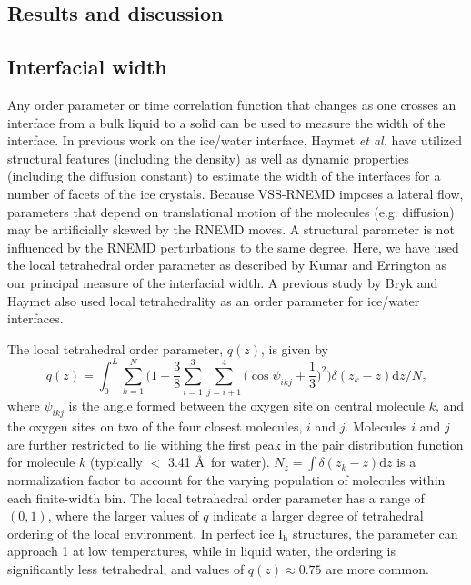 \documentclass[11pt]{article}
\begin{document}
\begin{doublespace}
\section{Results and discussion}

\subsection{Interfacial width}
Any order parameter or time correlation function that changes as one
crosses an interface from a bulk liquid to a solid can be used to
measure the width of the interface.  In previous work on the ice/water
interface, Haymet {\it et al.}\cite{Bryk02} have utilized structural
features (including the density) as well as dynamic properties
(including the diffusion constant) to estimate the width of the
interfaces for a number of facets of the ice crystals.  Because
VSS-RNEMD imposes a lateral flow, parameters that depend on
translational motion of the molecules (e.g. diffusion) may be
artificially skewed by the RNEMD moves.  A structural parameter is not
influenced by the RNEMD perturbations to the same degree. Here, we
have used the local tetrahedral order parameter as described by
Kumar\cite{Kumar09} and Errington\cite{Errington01} as our principal
measure of the interfacial width.  A previous study by Bryk and Haymet
also used local tetrahedrality as an order parameter for ice/water
interfaces.\cite{Bryk2004b}

The local tetrahedral order parameter, $q(z)$, is given by
\begin{equation}
q(z) = \int_0^L \sum_{k=1}^{N} \Bigg(1 -\frac{3}{8}\sum_{i=1}^{3}
\sum_{j=i+1}^{4} \bigg(\cos\psi_{ikj}+\frac{1}{3}\bigg)^2\Bigg)
\delta(z_{k}-z)\mathrm{d}z \Bigg/ N_z
\label{eq:qz}
\end{equation}
where $\psi_{ikj}$ is the angle formed between the oxygen site on
central molecule $k$, and the oxygen sites on two of the four closest
molecules, $i$ and $j$.  Molecules $i$ and $j$ are further restricted
to lie withing the first peak in the pair distribution function for
molecule $k$ (typically $<$ 3.41 \AA\ for water).  $N_z = \int
\delta(z_k - z) \mathrm{d}z$ is a normalization factor to account for
the varying population of molecules within each finite-width bin.  The
local tetrahedral order parameter has a range of $(0,1)$, where the
larger values of $q$ indicate a larger degree of tetrahedral ordering
of the local environment.  In perfect ice I$_\mathrm{h}$ structures,
the parameter can approach 1 at low temperatures, while in liquid
water, the ordering is significantly less tetrahedral, and values of
$q(z) \approx 0.75$ are more common.


\end{doublespace}
\end{document}
